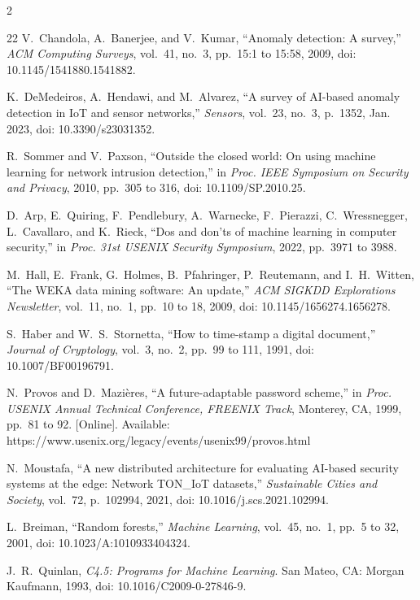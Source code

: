 \documentclass[journal,onecolumn]{IEEEtran}
\begin{document}
\begin{multicols}{2}
\begin{thebibliography}{22}
V.~Chandola, A.~Banerjee, and V.~Kumar, ``Anomaly detection: A survey,'' \emph{ACM Computing Surveys}, vol.~41, no.~3, pp.~15:1 to 15:58, 2009, doi: 10.1145/1541880.1541882.

K.~DeMedeiros, A.~Hendawi, and M.~Alvarez, ``A survey of AI-based anomaly detection in IoT and sensor networks,'' \emph{Sensors}, vol.~23, no.~3, p.~1352, Jan. 2023, doi: 10.3390/s23031352.

R.~Sommer and V.~Paxson, ``Outside the closed world: On using machine learning for network intrusion detection,'' in \emph{Proc. IEEE Symposium on Security and Privacy}, 2010, pp.~305 to 316, doi: 10.1109/SP.2010.25.

D.~Arp, E.~Quiring, F.~Pendlebury, A.~Warnecke, F.~Pierazzi, C.~Wressnegger, L.~Cavallaro, and K.~Rieck, ``Dos and don'ts of machine learning in computer security,'' in \emph{Proc. 31st USENIX Security Symposium}, 2022, pp.~3971 to 3988.

M.~Hall, E.~Frank, G.~Holmes, B.~Pfahringer, P.~Reutemann, and I.~H.~Witten, ``The WEKA data mining software: An update,'' \emph{ACM SIGKDD Explorations Newsletter}, vol.~11, no.~1, pp.~10 to 18, 2009, doi: 10.1145/1656274.1656278.

S.~Haber and W.~S.~Stornetta, ``How to time-stamp a digital document,'' \emph{Journal of Cryptology}, vol.~3, no.~2, pp.~99 to 111, 1991, doi: 10.1007/BF00196791.

N.~Provos and D.~Mazi{\`e}res, ``A future-adaptable password scheme,'' in \emph{Proc. USENIX Annual Technical Conference, FREENIX Track}, Monterey, CA, 1999, pp.~81 to 92. [Online]. Available: https://www.usenix.org/legacy/events/usenix99/provos.html

N.~Moustafa, ``A new distributed architecture for evaluating AI-based security systems at the edge: Network TON\_IoT datasets,'' \emph{Sustainable Cities and Society}, vol.~72, p.~102994, 2021, doi: 10.1016/j.scs.2021.102994.

L.~Breiman, ``Random forests,'' \emph{Machine Learning}, vol.~45, no.~1, pp.~5 to 32, 2001, doi: 10.1023/A:1010933404324.

J.~R.~Quinlan, \emph{C4.5: Programs for Machine Learning}. San Mateo, CA: Morgan Kaufmann, 1993, doi: 10.1016/C2009-0-27846-9.


\end{thebibliography}
\end{multicols}
\end{document}
